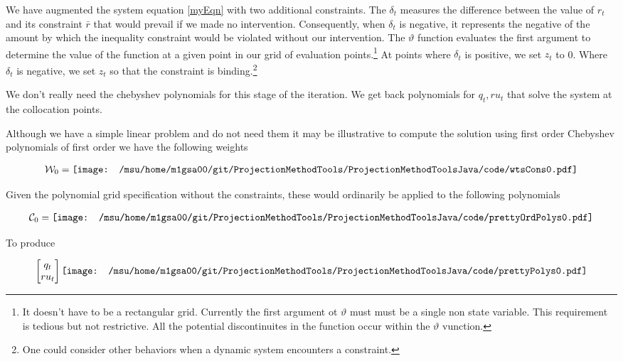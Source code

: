 \documentclass[12pt]{article}
\begin{document}
We have augmented the system equation \ref{myEqn} with 
two additional constraints.
The $\delta_t$ measures the difference between the value of $r_t$ and its constraint $\bar{r}$ that would prevail if we made no intervention.  Consequently, when $\delta_t$ is negative, it represents the negative of the amount by which the inequality constraint would be violated without our intervention.  The $\vartheta$ function evaluates the first argument to determine the value of the function at a given point in our grid of evaluation points.\footnote{It doesn't have to be a rectangular grid.  Currently the first argument ot $\vartheta$ must must be a single non state variable.  This requirement is tedious but not restrictive.  All the potential discontinuites in the function occur within the $\vartheta$ vunction.} At points where $\delta_t$ is positive, we set $z_t$ to 0.  Where $\delta_t$ is negative, we set $z_t$ so that the constraint is binding.\footnote{ One could consider other behaviors when a dynamic system encounters a constraint.}

We don't really need the chebyshev polynomials for this stage of the iteration.
We get back polynomials for $q_t, ru_t$ that solve the system at the collocation points.

Although we have a simple linear problem and do not need them it may be illustrative to 
compute the solution using first order Chebyshev polynomials of first order we have the following weights

 \begin{gather*}
\mathcal{W}_0=   \vcenter{\hbox{\texttt{[image: /msu/home/m1gsa00/git/ProjectionMethodTools/ProjectionMethodToolsJava/code/wtsCons0.pdf]}}}
 \end{gather*}


Given the polynomial grid specification without the constraints, these would ordinarily be applied to the following polynomials


 \begin{gather*}
\mathcal{C}_0=   \vcenter{\hbox{\texttt{[image: /msu/home/m1gsa00/git/ProjectionMethodTools/ProjectionMethodToolsJava/code/prettyOrdPolys0.pdf]}}}
 \end{gather*}

To produce

 \begin{gather*}
   \begin{bmatrix}
     q_t\\ru_t
   \end{bmatrix}
\vcenter{\hbox{\texttt{[image: /msu/home/m1gsa00/git/ProjectionMethodTools/ProjectionMethodToolsJava/code/prettyPolys0.pdf]}}}
 \end{gather*}
\end{document}
